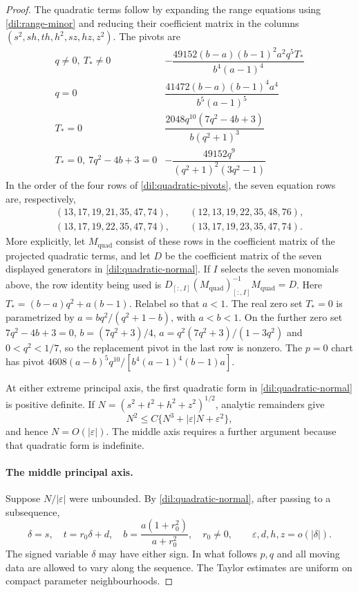 \documentclass[11pt,a4paper]{article}
\numberwithin{equation}{section}
\theoremstyle{plain}
\theoremstyle{definition}
\theoremstyle{remark}
\begin{document}
\begin{proof}
The quadratic terms follow by expanding the range equations using \eqref{dil:range-minor} and reducing their coefficient matrix in the columns
$(s^2,sh,th,h^2,sz,hz,z^2)$.  The pivots are
\begin{equation}\label{dil:quadratic-pivots}
\begin{array}{c|c}
 q\ne0,\ T_*\ne0&
 -\dfrac{49152(b-a)(b-1)^2a^2q^5T_*}{b^4(a-1)^4}\\[1mm]
 q=0&\dfrac{41472(b-a)(b-1)^4a^4}{b^5(a-1)^5}\\[1mm]
 T_*=0&\dfrac{2048q^{10}(7q^2-4b+3)}{b(q^2+1)^3}\\[1mm]
 T_*=0,\ 7q^2-4b+3=0&
 -\dfrac{49152q^9}{(q^2+1)^2(3q^2-1)}
\end{array}
\end{equation}
In the order of the four rows of \eqref{dil:quadratic-pivots}, the
seven equation rows are, respectively,
\[
\begin{gathered}
(13,17,19,21,35,47,74),\qquad
(12,13,19,22,35,48,76),\\
(13,17,19,22,35,47,74),\qquad
(13,17,19,23,35,47,74).
\end{gathered}
\]
More explicitly, let $M_{\mathrm{quad}}$ consist of these rows in the coefficient
matrix of the projected quadratic terms, and let $D$ be the
coefficient matrix of the seven displayed generators in
\eqref{dil:quadratic-normal}.  If $I$ selects the seven monomials
above, the row identity being used is
$D_{[:,I]}(M_{\mathrm{quad}})_{[:,I]}^{-1}M_{\mathrm{quad}}=D$.  
Here $T_*=(b-a)q^2+a(b-1)$.  Relabel so that $a<1$.  The real
zero set $T_*=0$ is parametrized by $a=bq^2/(q^2+1-b)$, with $a<b<1$.
On the further zero set $7q^2-4b+3=0$,
$b=(7q^2+3)/4$, $a=q^2(7q^2+3)/(1-3q^2)$ and $0<q^2<1/7$,
so the replacement pivot in the last row is nonzero.  The $p=0$ chart
has pivot $4608(a-b)^5q^{10}/[b^4(a-1)^4(b-1)a]$.  

At either extreme principal axis, the first quadratic form in \eqref{dil:quadratic-normal} is positive definite.  If
$N=(s^2+t^2+h^2+z^2)^{1/2}$, analytic remainders give
\[
 N^2\le C\{N^3+|\varepsilon|N+\varepsilon^2\},
\]
and hence $N=O(|\varepsilon|)$.  The middle axis requires a further
argument because that quadratic form is indefinite.

\paragraph{The middle principal axis.}
Suppose $N/|\varepsilon|$ were unbounded.  By
\eqref{dil:quadratic-normal}, after passing to a subsequence,
\[
 \delta=s,\quad t=r_0\delta+d,\quad
 b=\frac{a(1+r_0^2)}{a+r_0^2},\quad r_0\ne0,
 \qquad \varepsilon,d,h,z=o(|\delta|).
\]
The signed variable $\delta$ may have either sign.  In what follows
$p,q$ and all moving data are allowed to vary along the
sequence.  The Taylor estimates are uniform on compact parameter neighbourhoods.


\end{proof}
\end{document}
